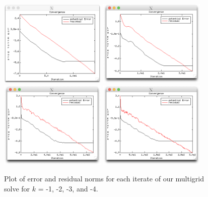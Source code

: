 \begin{refsection}
\begin{figure}
\centering
\includegraphics[width=2in]{figures/errorAnisoK1_r6.png}\hfil
\includegraphics[width=2in]{figures/errorAnisoK2_r6.png}\\
\includegraphics[width=2in]{figures/errorAnisoK3_r6.png}\hfil
\includegraphics[width=2in]{figures/errorAnisoK4_r6.png}
\caption{Plot of error and residual norms for each iterate of our multigrid solve for $k$ = -1, -2, -3, and -4.\label{fig:errorAnisoK}}
\end{figure}


\end{refsection}
